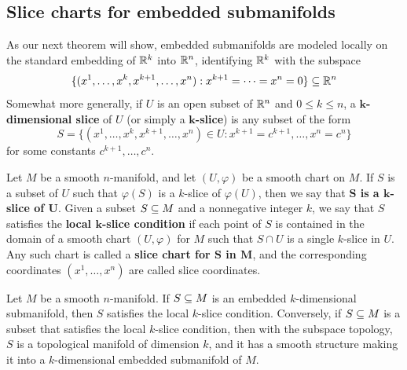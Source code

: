 \subsection{Slice charts for embedded submanifolds}
As our next theorem will show, embedded submanifolds are modeled locally on the
standard embedding of $\mathbb{R}^k$ into $\mathbb{R}^n$, identifying $\mathbb{R}^k$ with the subspace
\[\{(x^1,\dots,x^{k},x^{k+1},\dots,x^n):x^{k+1}=\cdots=x^n=0\}\subseteq\mathbb{R}^n\]
Somewhat more generally, if $U$ is an open subset of $\mathbb{R}^n$ and $0\leq k\leq n$, a \textbf{$\bm{k}$-dimensional slice} of $U$ (or simply a \textbf{$\bm{k}$-slice}) is any subset of the form
\[S=\{(x^1,\dots,x^{k},x^{k+1},\dots,x^n)\in U:x^{k+1}=c^{k+1},\dots,x^n=c^n\}\]
for some constants $c^{k+1},\dots,c^n$.\par
Let $M$ be a smooth $n$-manifold, and let $(U,\varphi)$ be a smooth chart on $M$. If $S$ is a subset of $U$ such that $\varphi(S)$ is a $k$-slice of $\varphi(U)$, then we say that \textbf{$\bm{S}$ is a $\bm{k}$-slice of $\bm{U}$}. Given a subset $S\subseteq M$ and a nonnegative integer $k$, we say that $S$ satisfies the \textbf{local $\bm{k}$-slice condition} if each point of $S$ is contained in the domain of a smooth chart $(U,\varphi)$ for $M$ such that $S\cap U$ is a single $k$-slice in $U$. Any such chart is called a \textbf{slice chart for $\bm{S}$ in $\bm{M}$}, and the corresponding coordinates $(x^1,\dots,x^n)$ are called slice coordinates.
\begin{theorem}\label{embedd submani iff local slice}
Let $M$ be a smooth $n$-manifold. If $S\subseteq M$ is an embedded $k$-dimensional submanifold, then $S$ satisfies the local $k$-slice condition. Conversely, if $S\subseteq M$ is a subset that satisfies the local $k$-slice condition, then with the subspace topology, $S$ is a topological manifold of dimension $k$, and it has a smooth structure making it into a $k$-dimensional embedded submanifold of $M$.
\end{theorem}
